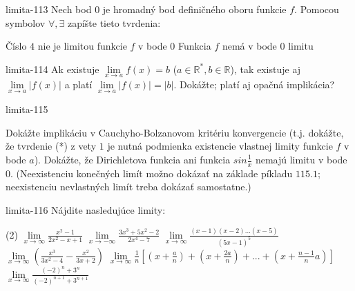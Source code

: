 \begin{defproblem}{limita-113}
Nech bod $0$ je hromadný bod definičného oboru funkcie $f$. Pomocou symbolov
$\forall, \exists$ zapíšte tieto tvrdenia:
\begin{tasks}
\task Číslo $4$ nie je limitou funkcie $f$ v bode $0$
\task Funkcia $f$ nemá v bode $0$ limitu
\end{tasks}
\end{defproblem}

\begin{defproblem}{limita-114}
Ak existuje $\lim\limits_{x \rightarrow a} f(x)=b$ ($a \in \mathbb{R^*},b \in
\mathbb{R}$), tak existuje aj $\lim\limits_{x \rightarrow a} |f(x)|$ a platí $\lim\limits_{x
\rightarrow a} |f(x)|=|b|$. Dokážte; platí aj opačná implikácia?
\end{defproblem}

\begin{defproblem}{limita-115}
\begin{tasks}
\task Dokážte implikáciu v Cauchyho-Bolzanovom kritériu konvergencie (t.j.
dokážte, že tvrdenie (*) z vety $1$ je nutná podmienka existencie vlastnej
limity funkcie $f$ v bode $a$).
\task Dokážte, že Dirichletova funkcia ani funkcia $sin \frac{1}{x}$ nemajú
limitu v bode $0$. (Neexistenciu konečných limít možno dokázať na základe
píkladu $115.1$; neexistenciu nevlastných limít treba dokázať samostatne.)
\end{tasks}
\end{defproblem}

\begin{defproblem}{limita-116}
Nájdite nasledujúce limity:
\begin{tasks}(2)
    \task $\lim\limits_{{x \to \infty}} \frac{x^2-1}{2x^2-x+1}$
    \task $\lim\limits_{{x \to -\infty}} \frac{3x^3+5x^2-2}{2x^4-7}$
    \task $\lim\limits_{{x \to \infty}} \frac{(x-1)(x-2)...(x-5)}{(5x-1)^5}$
    \task $\lim\limits_{{x \to \infty}} (\frac{x^3}{3x^2-4}-\frac{x^2}{3x+2})$
    \task* $\lim\limits_{{x \to \infty}} \frac{1}{n}[(x+\frac{a}{n})+(x+\frac{2a}{n})+...+(x+\frac{n-1}{n}a)]$
    \task $\lim\limits_{{x \to \infty}} \frac{(-2)^n+3^n}{(-2)^{n+1}+3^{n+1}}$
\end{tasks}
\end{defproblem}

